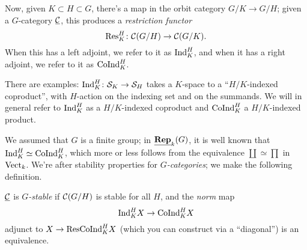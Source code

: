 \documentclass{amsart}
\begin{document}
Now, given $K \subset H \subset G$, there's a map in the orbit category $G/K \rightarrow G/H$;
given a $G$-category $\underline{\mathcal{C}}$, this produces a \emph{restriction functor}
\[
  \mathrm{Res}_K^H\colon \mathcal{C}(G/H) \rightarrow \mathcal{C}(G/K).
\]
When this has a left adjoint, we refer to it as $\mathrm{Ind}_K^H$, and when it has a right adjoint, we refer to it as $\mathrm{CoInd}_K^H$.

There are examples:
$\mathrm{Ind}_K^H\colon \mathcal{S}_K \rightarrow \mathcal{S}_H$ takes a $K$-space to a ``$H/K$-indexed coproduct'', with $H$-action on the indexing set and on the summands.
We will in general refer to $\mathrm{Ind}_K^H$ as a $H/K$-indexed coproduct and $\mathrm{CoInd}_K^H$ a $H/K$-indexed product.

We assumed that $G$ is a finite group;
in $\underline{\mathbf{Rep}}_k(G)$, it is well known that $\mathrm{Ind}_K^H \simeq \mathrm{CoInd}_K^H$, which more or less follows from the equivalence $\coprod \simeq \prod$ in $\mathrm{Vect}_k$.
We're after stability properties for \emph{$G$-categories};
we make the following definition.

\begin{definition}
  $\underline{\mathcal{C}}$ is \emph{$G$-stable} if $\mathcal{C}(G/H)$ is stable for all $H$, and the \emph{norm} map
  \[
    \mathrm{Ind}_K^H X \rightarrow \mathrm{CoInd}_K^H X 
  \]
  adjunct to $X \rightarrow \mathrm{Res} \mathrm{CoInd}_K^H X$ (which you can construct via a ``diagonal'') is an equivalence.
\end{definition}
\end{document}
